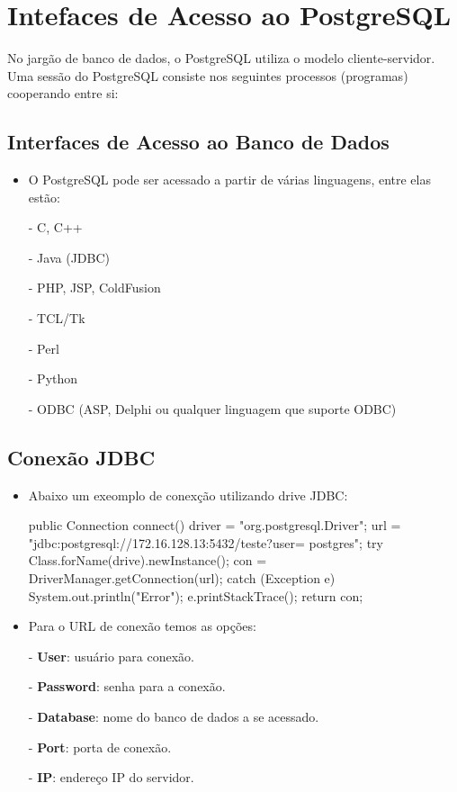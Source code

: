 \newpage \chapter{Intefaces de Acesso ao PostgreSQL}\setcounter{SteP}{1}
    No jargão de banco de dados, o PostgreSQL utiliza o modelo cliente-servidor.
Uma sessão do PostgreSQL consiste nos seguintes processos (programas) cooperando entre si:

\section{Interfaces de Acesso ao Banco de Dados}\setcounter{SteP}{1}

\begin{itemize}
\item{\bf }O PostgreSQL pode ser acessado a partir de várias linguagens, entre elas
estão:

    - C, C++

    - Java (JDBC)

    - PHP, JSP, ColdFusion

    - TCL/Tk

    - Perl

    - Python

    - ODBC (ASP, Delphi ou qualquer linguagem que suporte ODBC)

\end{itemize}

\section{ Conexão JDBC }\setcounter{SteP}{1}

\begin{itemize}
	\item{\bf }Abaixo um exeomplo de conexção utilizando drive JDBC:
\begin{VerbatimNumerado}
	public Connection connect() {
	    driver = "org.postgresql.Driver";
	    url = "jdbc:postgresql://172.16.128.13:5432/teste?user=
	        postgres";
	    try{
	       Class.forName(drive).newInstance();
	       con = DriverManager.getConnection(url);
	   }
	   catch (Exception e){
	       System.out.println("Error");
	       e.printStackTrace();
	   }
           return con;
	}
\end{VerbatimNumerado}
\item{\bf } Para o URL de conexão temos as opções:

	- {\bf User}: usuário para conexão.

	- {\bf Password}: senha para a conexão.

	- {\bf Database}: nome do banco de dados a se acessado.
     
        - {\bf Port}: porta de conexão.

	- {\bf IP}:  endereço IP do servidor.

\end{itemize}

